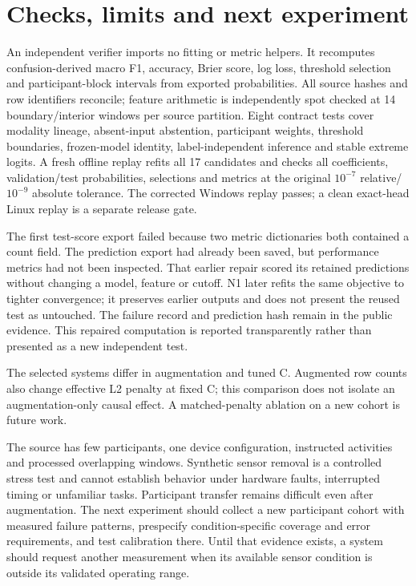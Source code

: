 \documentclass[11pt]{article}
\begin{document}
\section{Checks, limits and next experiment}
An independent verifier imports no fitting or metric helpers. It recomputes confusion-derived macro F1, accuracy, Brier score, log loss, threshold selection and participant-block intervals from exported probabilities. All source hashes and row identifiers reconcile; feature arithmetic is independently spot checked at 14 boundary/interior windows per source partition. Eight contract tests cover modality lineage, absent-input abstention, participant weights, threshold boundaries, frozen-model identity, label-independent inference and stable extreme logits. A fresh offline replay refits all 17 candidates and checks all coefficients, validation/test probabilities, selections and metrics at the original $10^{-7}$ relative/$10^{-9}$ absolute tolerance. The corrected Windows replay passes; a clean exact-head Linux replay is a separate release gate.

The first test-score export failed because two metric dictionaries both contained a count field. The prediction export had already been saved, but performance metrics had not been inspected. That earlier repair scored its retained predictions without changing a model, feature or cutoff. N1 later refits the same objective to tighter convergence; it preserves earlier outputs and does not present the reused test as untouched. The failure record and prediction hash remain in the public evidence. This repaired computation is reported transparently rather than presented as a new independent test.

The selected systems differ in augmentation and tuned C. Augmented row counts also change effective L2 penalty at fixed C; this comparison does not isolate an augmentation-only causal effect. A matched-penalty ablation on a new cohort is future work.

The source has few participants, one device configuration, instructed activities and processed overlapping windows. Synthetic sensor removal is a controlled stress test and cannot establish behavior under hardware faults, interrupted timing or unfamiliar tasks. Participant transfer remains difficult even after augmentation. The next experiment should collect a new participant cohort with measured failure patterns, prespecify condition-specific coverage and error requirements, and test calibration there. Until that evidence exists, a system should request another measurement when its available sensor condition is outside its validated operating range.
\end{document}
